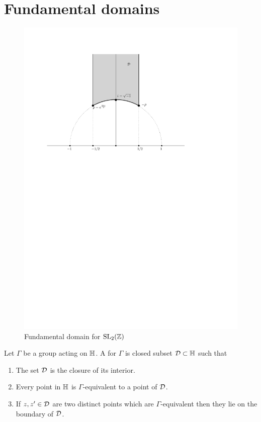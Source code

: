 \section{Fundamental domains}
\begin{figure}[h]
\centering\includegraphics[scale=0.5]{fundomSL2Z.pdf}
\caption{Fundamental domain for $\operatorname{SL}_2(\mathbb{Z})$}
\end{figure}

\begin{definition}
  Let $\Gamma$ be a group acting on $\mathbb{H}$. A  for $\Gamma$ is closed subset $\mathcal{D}\subset\mathbb{H}$ such that
  \begin{enumerate}
  \item The set $\mathcal{D}$ is the closure of its interior.
  \item Every point in $\mathbb{H}$ is $\Gamma$-equivalent to a point of $\mathcal{D}$.
  \item If $z,z'\in\mathcal{D}$ are two distinct points which are $\Gamma$-equivalent then they lie on the boundary of $\mathcal{D}$.
  \end{enumerate}
\end{definition}

